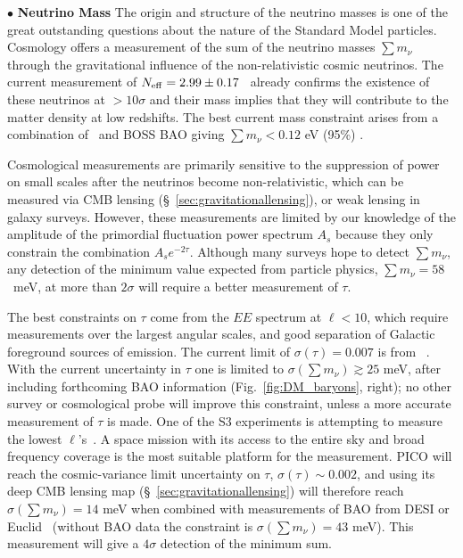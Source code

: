 \documentclass[PICOReport.tex]{subfiles}
\begin{document}
\noindent$\bullet$ {\bf Neutrino Mass} \hspace{0.1in} \label{neutrino_fundamental} The origin and structure of the neutrino masses is one of the great outstanding  questions about the nature of the Standard Model particles.  
Cosmology offers a  measurement of the sum of the neutrino masses $\sum m_\nu$ through the gravitational influence of the non-relativistic  cosmic neutrinos.  The current measurement of ${N_{\rm eff}} = 2.99 \pm 0.17$~\citep{Planck2018_VI} already confirms the existence of these neutrinos at $>10\sigma$ and their mass implies that they will contribute to the matter density at low redshifts.  The best current mass constraint arises from a combination of  \planck~and BOSS \ac{BAO} giving $\sum m_\nu < 0.12$ eV (95\%) \cite{Planck2018_VI}.

Cosmological measurements are primarily sensitive to the suppression of power on small scales after the neutrinos become non-relativistic, which can be measured via CMB lensing (\S~\ref{sec:gravitationallensing}), or weak lensing in galaxy surveys.  However, these measurements are limited by our knowledge of the amplitude of the primordial fluctuation power spectrum $A_s$ because they only constrain the combination $A_s e^{-2 \tau}$. Although many surveys hope to detect $\sum m_\nu$, any detection of the minimum value expected from particle physics, $\sum m_\nu = 58$~meV, at more than $2 \sigma$ will require a better measurement of $\tau$.

The best constraints on $\tau$ come from the $EE$ spectrum at $\ell < 10$, which require measurements over the largest angular scales, and good separation of Galactic foreground sources of emission. The current limit of $\sigma({\tau}) = 0.007$ is from \planck~\cite{Planck2018_VI}.
With the current uncertainty in $\tau$ one is limited to  $\sigma(\sum m_\nu) \gtrsim 25$ meV, after including forthcoming \ac{BAO} information (Fig.~\ref{fig:DM_baryons}, right); no other survey or cosmological probe will improve this constraint, unless a more accurate measurement of $\tau$ is made. One of the S3 experiments is attempting to measure the lowest $\ell$'s~\citep{class}. A space mission with its access to the entire sky and broad frequency coverage is the most suitable platform for the measurement. PICO will reach the cosmic-variance limit uncertainty on $\tau$, $\sigma(\tau) \sim 0.002$, and using its deep CMB lensing map (\S~\ref{sec:gravitationallensing}) will therefore reach $\sigma(\sum m_\nu) = 14$ meV when combined with measurements of \ac{BAO} from DESI or Euclid~\cite{Levi:2013gra} (without \ac{BAO} data the constraint is $\sigma(\sum m_\nu) = 43$ meV).  This measurement will give a $4\sigma$ detection of the minimum sum. 
\end{document}
